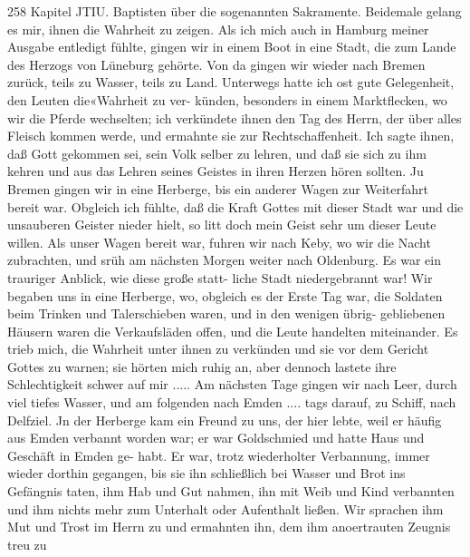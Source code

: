 258 Kapitel JTIU.
Baptisten über die sogenannten Sakramente. Beidemale gelang
es mir, ihnen die Wahrheit zu zeigen.
Als ich mich auch in Hamburg meiner Ausgabe entledigt
fühlte, gingen wir in einem Boot in eine Stadt, die zum Lande
des Herzogs von Lüneburg gehörte. Von da gingen wir wieder
nach Bremen zurück, teils zu Wasser, teils zu Land. Unterwegs
hatte ich ost gute Gelegenheit, den Leuten die«Wahrheit zu ver-
künden, besonders in einem Marktflecken, wo wir die Pferde
wechselten; ich verkündete ihnen den Tag des Herrn, der über
alles Fleisch kommen werde, und ermahnte sie zur Rechtschaffenheit.
Ich sagte ihnen, daß Gott gekommen sei, sein Volk selber zu
lehren, und daß sie sich zu ihm kehren und aus das Lehren seines
Geistes in ihren Herzen hören sollten.
Ju Bremen gingen wir in eine Herberge, bis ein anderer
Wagen zur Weiterfahrt bereit war. Obgleich ich fühlte, daß die
Kraft Gottes mit dieser Stadt war und die unsauberen Geister
nieder hielt, so litt doch mein Geist sehr um dieser Leute willen.
Als unser Wagen bereit war, fuhren wir nach Keby, wo wir die
Nacht zubrachten, und srüh am nächsten Morgen weiter nach
Oldenburg. Es war ein trauriger Anblick, wie diese große statt-
liche Stadt niedergebrannt war! Wir begaben uns in eine
Herberge, wo, obgleich es der Erste Tag war, die Soldaten beim
Trinken und Talerschieben waren, und in den wenigen übrig-
gebliebenen Häusern waren die Verkaufsläden offen, und die Leute
handelten miteinander. Es trieb mich, die Wahrheit unter ihnen
zu verkünden und sie vor dem Gericht Gottes zu warnen; sie
hörten mich ruhig an, aber dennoch lastete ihre Schlechtigkeit
schwer auf mir .....
Am nächsten Tage gingen wir nach Leer, durch viel tiefes
Wasser, und am folgenden nach Emden .... tags darauf, zu
Schiff, nach Delfziel. Jn der Herberge kam ein Freund zu uns,
der hier lebte, weil er häufig aus Emden verbannt worden war;
er war Goldschmied und hatte Haus und Geschäft in Emden ge-
habt. Er war, trotz wiederholter Verbannung, immer wieder
dorthin gegangen, bis sie ihn schließlich bei Wasser und Brot ins
Gefängnis taten, ihm Hab und Gut nahmen, ihn mit Weib und
Kind verbannten und ihm nichts mehr zum Unterhalt oder
Aufenthalt ließen. Wir sprachen ihm Mut und Trost im Herrn
zu und ermahnten ihn, dem ihm anoertrauten Zeugnis treu zu


